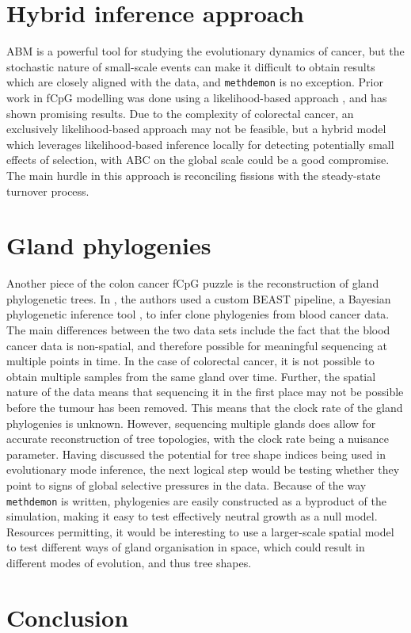 \section{Hybrid inference approach}
ABM is a powerful tool for studying the evolutionary dynamics of cancer, but the
stochastic nature of small-scale events can make it difficult to obtain results
which are closely aligned with the data, and \texttt{methdemon} is no exception.
Prior work in fCpG modelling was done using a likelihood-based approach
\cite{gabbutt_fluctuating_2022, gabbutt_evolutionary_2023}, and has shown
promising results. Due to the complexity of colorectal cancer, an exclusively
likelihood-based approach may not be feasible, but a hybrid model which
leverages likelihood-based inference locally for detecting potentially small
effects of selection, with ABC on the global scale could be a good compromise.
The main hurdle in this approach is reconciling fissions with the steady-state
turnover process.

\section{Gland phylogenies}
Another piece of the colon cancer fCpG puzzle is the reconstruction of gland
phylogenetic trees. In \cite{gabbutt_evolutionary_2023}, the authors used a custom BEAST pipeline,
a Bayesian phylogenetic inference tool \cite{bouckaert_beast_2019}, to infer
clone phylogenies from blood cancer data. The main differences between the two
data sets include the fact that the blood cancer data is non-spatial, and
therefore possible for meaningful sequencing at multiple points in time. In the
case of colorectal cancer, it is not possible to obtain multiple samples from
the same gland over time. Further, the spatial nature of the data means that
sequencing it in the first place may not be possible before the tumour has been
removed. This means that the clock rate of the gland phylogenies is unknown.
However, sequencing multiple glands does allow for accurate reconstruction of
tree topologies, with the clock rate being a nuisance parameter. Having
discussed the potential for tree shape indices being used in evolutionary mode
inference, the next logical step would be testing whether they point to signs of
global selective pressures in the data. Because of the way \texttt{methdemon} is
written, phylogenies are easily constructed as a byproduct of the simulation,
making it easy to test effectively neutral growth as a null model. Resources
permitting, it would be interesting to use a larger-scale spatial model to test
different ways of gland organisation in space, which could result in different
modes of evolution, and thus tree shapes.

\section{Conclusion}
